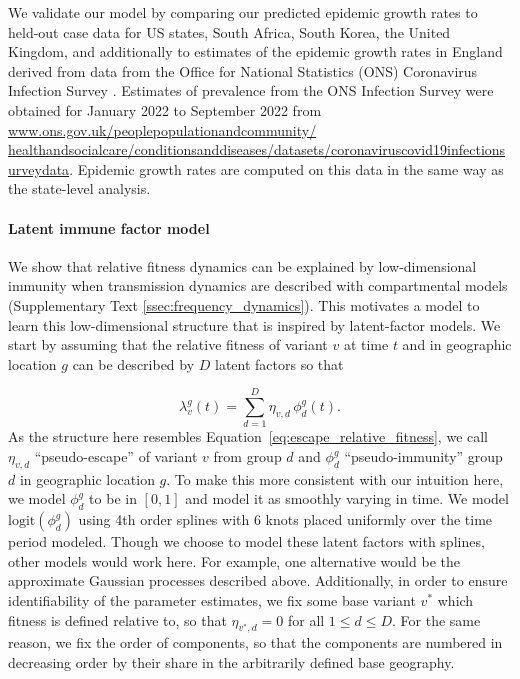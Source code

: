 \documentclass[11pt,oneside,letterpaper]{article}
\newcommand{\varEscape}{\eta}
\begin{document}
We validate our model by comparing our predicted epidemic growth rates to held-out case data for US states, South Africa, South Korea, the United Kingdom, and additionally to estimates of the epidemic growth rates in England derived from data from the Office for National Statistics (ONS) Coronavirus Infection Survey \cite{pouwels2021community}.
Estimates of prevalence from the ONS Infection Survey were obtained for January 2022 to September 2022 from \href{https://www.ons.gov.uk/peoplepopulationandcommunity/healthandsocialcare/conditionsanddiseases/datasets/coronaviruscovid19infectionsurveydata}{www.ons.gov.uk/peoplepopulationandcommunity/ healthandsocialcare/conditionsanddiseases/datasets/coronaviruscovid19infectionsurveydata}.
Epidemic growth rates are computed on this data in the same way as the state-level analysis.

\paragraph{Latent immune factor model}

We show that relative fitness dynamics can be explained by low-dimensional immunity when transmission dynamics are described with compartmental models (Supplementary Text \ref{ssec:frequency_dynamics}).
This motivates a model to learn this low-dimensional structure that is inspired by latent-factor models.
We start by assuming that the relative fitness of variant $v$ at time $t$ and in geographic location $g$ can be described by $D$ latent factors so that

\begin{equation}
    \lambda_{v}^{g}(t) = \sum_{d=1}^{D} \varEscape_{v,d} \, \phi_{d}^{g}(t).
\end{equation}
As the structure here resembles Equation~\ref{eq:escape_relative_fitness}, we call $\varEscape_{v,d}$ ``pseudo-escape'' of variant $v$ from group $d$ and $\phi_{d}^{g}$ ``pseudo-immunity'' group $d$ in geographic location $g$.
To make this more consistent with our intuition here, we model $\phi_{d}^{g}$ to be in $[0,1]$ and model it as smoothly varying in time.
We model $\text{logit}(\phi_{d}^{g})$ using 4th order splines with 6 knots placed uniformly over the time period modeled.
Though we choose to model these latent factors with splines, other models would work here.
For example, one alternative would be the approximate Gaussian processes described above.
Additionally, in order to ensure identifiability of the parameter estimates, we fix some base variant $v^*$ which fitness is defined relative to, so that $\varEscape_{v^*, d} = 0$ for all $1\leq d\leq D$.
For the same reason, we fix the order of components, so that the components are numbered in decreasing order by their share in the arbitrarily defined base geography.
\end{document}
